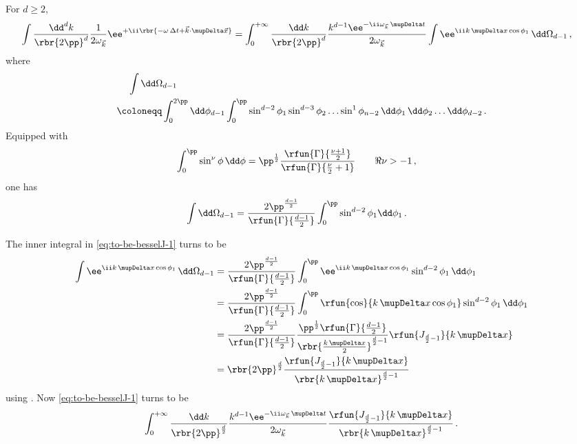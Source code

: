 \documentclass[a4paper]{article}
\numberwithin{equation}{subsection}
\begin{document}
For $d \ge 2$,
\begin{align}
\int \frac{\dd^d k}{\rbr{2\pp}^d} \frac{1}{2\omega_{\vec{k}}}
\ee^{+\ii \rbr{-\omega\,\Delta t + \vec{k}\cdot\mupDelta\vec{x}}}
&=
\int_{0}^{+\infty} \frac{\dd k}{\rbr{2\pp}^d}
	\frac{k^{d-1}\ee^{-\ii \omega_{\vec{k}}\,\mupDelta t}}{2\omega_{\vec{k}}}
	\int \ee^{\ii k\,\mupDelta x \cos \phi_1}\,\dd\Omega_{d-1}\,,
\label{eq:to-be-besselJ-1}
\end{align}
where
\begin{align}
\begin{split}
&\quad\,
\int \dd\Omega_{d-1}
\\
&\coloneqq
	\int_{0}^{2\pp} \dd\phi_{d-1}
	\int_{0}^{\pp} \sin^{d-2}\phi_1\sin^{d-3}\phi_2 \ldots \sin^{1}\phi_{n-2}\,
		\dd \phi_{1}\,\dd\phi_{2}\ldots\dd\phi_{d-2}\,.
\end{split}
\end{align}
Equipped with
\begin{align}
\int_{0}^{\pp} \sin^{\nu}\phi\,\dd\phi &= \pp^{\frac{1}{2}}
	\frac{\rfun{\Gamma}{\frac{\nu + 1}{2}}}{\rfun{\Gamma}{\frac{\nu}{2} + 1}}
\qquad
\Re \nu > -1\,,
\end{align}
one has
\begin{align}
\int \dd\Omega_{d-1} &=
	\frac{2\pp^{\frac{d-1}{2}}}{\rfun{\Gamma}{\frac{d-1}{2}}}
	\int_{0}^{\pp} \sin^{d-2}\phi_1 \dd\phi_1\,.
\end{align}

The inner integral in \cref{eq:to-be-besselJ-1} turns to be
\begin{align}
\int \ee^{\ii k\,\mupDelta x \cos \phi_1}\,\dd\Omega_{d-1} &=
\frac{2\pp^{\frac{d-1}{2}}}{\rfun{\Gamma}{\frac{d-1}{2}}}
	\int_{0}^{\pp} \ee^{\ii k\,\mupDelta x \cos \phi_1}\sin^{d-2}\phi_1
		\,\dd\phi_1
\nonumber \\
&=
\frac{2\pp^{\frac{d-1}{2}}}{\rfun{\Gamma}{\frac{d-1}{2}}}
	\int_{0}^{\pp} \rfun{\cos}{k\,\mupDelta x \cos \phi_1}\sin^{d-2}\phi_1
		\,\dd\phi_1
\nonumber \\
&=
\frac{2\pp^{\frac{d-1}{2}}}{\rfun{\Gamma}{\frac{d-1}{2}}}
	\frac{\pp^{\frac{1}{2}} \rfun{\Gamma}{\frac{d-1}{2}}}%
		{\rbr{\frac{k\,\mupDelta x}{2}}^{\frac{d}{2}-1}}
	\rfun{J_{\frac{d}{2}-1}}{k\,\mupDelta x}
\nonumber \\
&=
\rbr{2\pp}^{\frac{d}{2}} \frac{\rfun{J_{\frac{d}{2}-1}}{k\,\mupDelta x}}%
	{\rbr{k\,\mupDelta x}^{{\frac{d}{2}-1}}}
\end{align}
using \cite[eq.\ (10.9.4)]{NIST:DLMF}. Now \cref{eq:to-be-besselJ-1} turns to 
be
\begin{align}
\int_{0}^{+\infty} \frac{\dd k}{\rbr{2\pp}^{\frac{d}{2}}}
	\frac{k^{d-1}\ee^{-\ii \omega_{\vec{k}}\,\mupDelta t}}{2\omega_{\vec{k}}}
	\frac{\rfun{J_{\frac{d}{2}-1}}{k\,\mupDelta x}}%
	{\rbr{k\,\mupDelta x}^{{\frac{d}{2}-1}}}\,.
\end{align}
\end{document}
